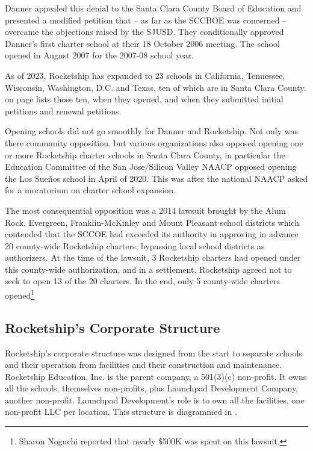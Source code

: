 Danner appealed this denial to the Santa Clara County Board of Education and presented a modified petition that – as far as the SCCBOE was concerned – overcame the objections raised by the SJUSD. They conditionally approved Danner's first charter school at their 18 October 2006 meeting. The school opened in August 2007 for the 2007-08 school year.

As of 2023, Rocketship has expanded to 23 schools in California, Tennessee, Wisconsin, Washington, D.C. and Texas, ten of which are in Santa Clara County.  on page \pageref{tab:RocketshipSchools} lists those ten, when they opened, and when they submitted initial petitions and renewal petitions.

Opening schools did not go smoothly for Danner and Rocketship. Not only was there community opposition, but various organizations also opposed opening one or more Rocketship charter schools in Santa Clara County, in particular the Education Committee of the San Jose/Silicon Valley NAACP opposed opening the Los Sueños school in April of 2020\parencite{MooreII.Marachi2020}. This was after the national NAACP asked for a moratorium on charter school expansion. 

The most consequential opposition was a 2014 lawsuit brought by the Alum Rock, Evergreen, Franklin-McKinley and Mount Pleasant school districts which contended that the SCCOE had exceeded its authority in approving in advance 20 county-wide Rocketship charters, bypassing local school districts as authorizers. At the time of the lawsuit, 3 Rocketship charters had opened under this county-wide authorization, and in a settlement, Rocketship agreed not to seek to open 13 of the 20 charters. In the end, only 5 county-wide charters opened\footnote{Sharon Noguchi reported that nearly \$500K was spent on this lawsuit\parencite{Noguchi2015}.}

\subsection{Rocketship's Corporate Structure}\label{sec:rocketship-corp-struct}\indent

Rocketship's corporate structure was designed from the start to separate schools and their operation from facilities and their construction and maintenance. Rocketship Education, Inc. is the parent company, a 501(3)(c) non-profit. It owns all the schools, themselves non-profits, plus Launchpad Development Company, another non-profit. Launchpad Development's role is to own all the facilities, one non-profit LLC per location. This structure is diagrammed in .


